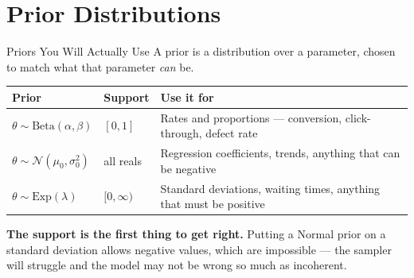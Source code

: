 \documentclass[aspectratio=169, 11pt]{beamer}
\begin{document}
\section{Prior Distributions}


\begin{frame}{Priors You Will Actually Use}
  A prior is a distribution over a parameter, chosen to match what that parameter \emph{can} be.

  \vspace{0.1cm}
  \begin{center}
    {\small
    \begin{tabular}{p{2.9cm}p{3.0cm}p{6.4cm}}
      \toprule
      \textbf{Prior} & \textbf{Support} & \textbf{Use it for} \\
      \midrule
      $\theta \sim \text{Beta}(\alpha, \beta)$ & $[0, 1]$ & Rates and proportions --- conversion,
      click-through, defect rate \\[3pt]
      $\theta \sim \mathcal{N}(\mu_0, \sigma_0^2)$ & all reals & Regression coefficients, trends,
      anything that can be negative \\[3pt]
      $\theta \sim \text{Exp}(\lambda)$ & $[0, \infty)$ & Standard deviations, waiting times,
      anything that must be positive \\
      \bottomrule
    \end{tabular}
    }
  \end{center}

  \vspace{0.1cm}
  \textbf{The support is the first thing to get right.} Putting a Normal prior on a standard
  deviation allows negative values, which are impossible --- the sampler will struggle and the
  model may not be wrong so much as incoherent.

  \vspace{0.1cm}
\end{frame}
\end{document}
